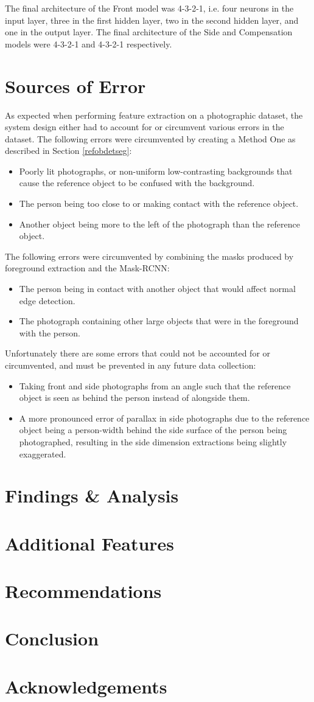 \documentclass[conference]{IEEEtran}
\begin{document}
The final architecture of the Front model was 4-3-2-1, i.e. four neurons in the input layer, three in the first hidden layer, two in the second hidden layer, and one in the output layer.
The final architecture of the Side and Compensation models were 4-3-2-1 and 4-3-2-1 respectively.
\section{Sources of Error}
As expected when performing feature extraction on a photographic dataset, the system design either had to account for or circumvent various errors in the dataset.
The following errors were circumvented by creating a Method One as described in Section \ref{refobdetseg}:
\begin{itemize}
	\item Poorly lit photographs, or non-uniform low-contrasting backgrounds that cause the reference object to be confused with the background.
	\item The person being too close to or making contact with the reference object.
	\item Another object being more to the left of the photograph than the reference object.
\end{itemize}
The following errors were circumvented by combining the masks produced by foreground extraction and the Mask-RCNN:
\begin{itemize}
	\item The person being in contact with another object that would affect normal edge detection.
	\item The photograph containing other large objects that were in the foreground with the person.
\end{itemize}
Unfortunately there are some errors that could not be accounted for or circumvented, and must be prevented in any future data collection:
\begin{itemize}
	\item Taking front and side photographs from an angle such that the reference object is seen as behind the person instead of alongside them.
	\item A more pronounced error of parallax in side photographs due to the reference object being a person-width behind the side surface of the person being photographed, resulting in the side dimension extractions being slightly exaggerated.
\end{itemize}
\section{Findings \& Analysis}

\section{Additional Features}

\section{Recommendations}

\section{Conclusion}

\section{Acknowledgements}



\end{document}
